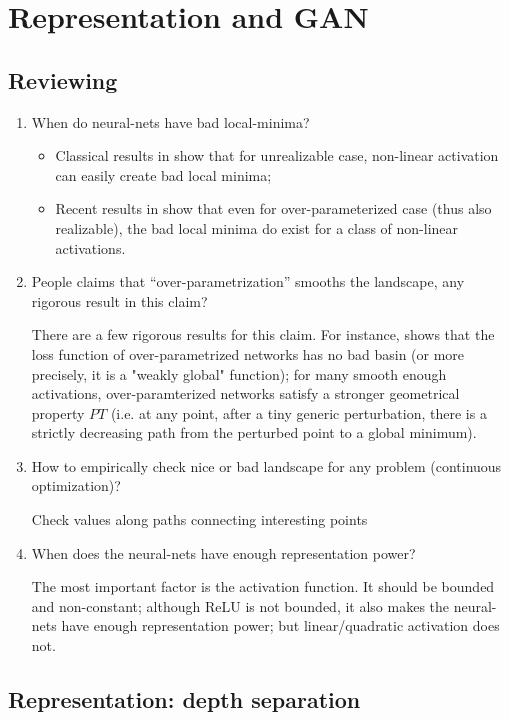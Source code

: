 \chapter{Representation and GAN}

\section{Reviewing}
\begin{enumerate}
\item
When do neural-nets have bad local-minima?
\begin{itemize}
\item
Classical results in \citep{NIPS19951028} show that for unrealizable case, non-linear activation can easily create bad local minima;
\item
Recent results in \citep{ruoyusun2018} show that even for over-parameterized case (thus also realizable), the bad local minima do exist for a class of non-linear activations.
\end{itemize}
\item
People claims that ``over-parametrization'' smooths  the landscape, any rigorous result in this claim?

There are a few rigorous results for this claim. 
For instance, \citep{ruoyusun2018} shows that the loss function of over-parametrized networks has no bad basin (or more precisely, it is a "weakly global" function);
for many smooth enough activations, over-paramterized networks satisfy a stronger geometrical property $PT$ (i.e. at any point, after a tiny generic perturbation, there is a strictly decreasing path from the perturbed point to a global minimum).
\item
How to empirically check nice or bad landscape for any problem (continuous optimization)?

Check values along paths connecting interesting points
\item
When does the neural-nets have enough representation power?

The most important factor is the activation function. It should be bounded and non-constant;
although ReLU is not bounded, it also makes the neural-nets have enough representation power;
but linear/quadratic activation does not.
\end{enumerate}

\section{Representation: depth separation}


